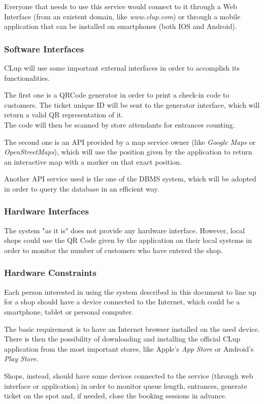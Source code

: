 \documentclass[table, 12pt]{article}
\begin{document}
\begin{flushleft}
    Everyone that needs to use this service would connect to it through a Web Interface (from an existent domain, like \textit{www.clup.com}) or through a mobile application that can be installed on smartphones (both IOS and Android).

    \subsubsection{Software Interfaces}
    CLup will use some important external interfaces in order to accomplish its functionalities.

    The first one is a QRCode generator in order to print a check-in code to customers.
    The ticket unique ID will be sent to the generator interface, which will return a valid QR representation of it.\\
    The code will then be scanned by store attendants for entrances counting.

    The second one is an API provided by a map service owner (like \textit{Google Maps} or \textit{OpenStreetMaps}), which will use the position given by the application to return an interactive map with a marker on that exact position.

    Another API service used is the one of the DBMS system, which will be adopted in order to query the database in an efficient way.
    \subsubsection{Hardware Interfaces}
    The system "as it is" does not provide any hardware interface. However, local shops could use the QR Code given by the application on their local systems in order to monitor the number of customers who have entered the shop.
    \subsubsection{Hardware Constraints}
    Each person interested in using the system described in this document to line up for a shop should have a device connected to the Internet, which could be a smartphone, tablet or personal computer.

    The basic requirement is to have an Internet browser installed on the used device.
    There is then the possibility of downloading and installing the official CLup application from the most important stores, like Apple's \textit{App Store} or Android's \textit{Play Store}.

    Shops, instead, should have some devices connected to the service (through web interface or application) in order to monitor queue length, entrances, generate ticket on the spot and, if needed, close the booking sessions in advance.


\end{flushleft}
\end{document}

